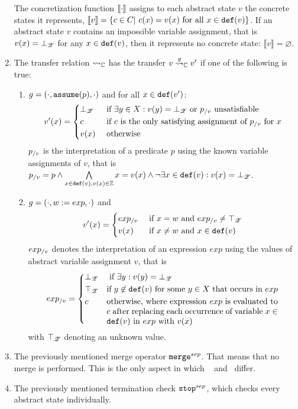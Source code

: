 \begin{enumerate}[leftmargin=*, label=\arabic*.]
	The concretization function $[\![ \cdot ]\!]$ assigns to each abstract state $v$ the concrete states it represents, $[\![ v ]\!] = \{ c \in C |\ c(x) = v(x) \text{ for all } x \in \texttt{def}(v)\}$.
	If an abstract state $v$ contains an impossible variable assignment, that is $v(x) = \bot_{\mathscr{Z}}$ for any $x \in \texttt{def}(v)$, then it represents no concrete state: $\llbracket v \rrbracket = \varnothing$.
\item The transfer relation $\rightsquigarrow_{\mathbb{C}}$ has the transfer $v \overset{g}{\rightsquigarrow}_{\mathbb{C}} v'$ if one of the following is true:
	\begin{enumerate}[label=\alph*)]
	\item $g = (\cdot, \texttt{assume}(p), \cdot)$ and for all $x \in \texttt{def}(v')$:
		\[ v'(x) = \begin{dcases}
			\bot_{\mathscr{Z}} & \text{ if } \exists y \in X : v(y) = \bot_{\mathscr{Z}} \text{ or } p_{/v} \text{ unsatisfiable}\\
			c & \text{ if $c$ is the only satisfying assignment of $p_{/v}$ for $x$}\\
			v(x) & \text{ otherwise }
		\end{dcases}\]
		$p_{/v}$ is the interpretation of a predicate $p$ using the known variable assignments of $v$, that is
		$p_{/v} = p \wedge \bigwedge\limits_{x \in \texttt{def}(v), v(x) \in \mathbb{Z}}  x = v(x) \wedge \neg \exists x \in \texttt{def}(v) : v(x) = \bot_{\mathscr{Z}}$.
	\item $g = (\cdot, w := exp, \cdot)$ and
		\[ v'(x) = \begin{dcases}
			exp_{/v} & \text{ if } x = w \text{ and } exp_{/v} \neq \top_{\mathscr{Z}}\\
			v(x) & \text{ if } x \neq w \text{ and } x \in \texttt{def}(v)\\
		\end{dcases}\]
		$exp_{/v}$ denotes the interpretation of an expression $exp$ using the values of abstract variable assignment $v$, that is
		\[exp_\using{v} = \begin{dcases}
			\bot_\valueset & \text{ if } \exists y : v(y) = \bot_\valueset\\
			\top_\valueset  & \parbox[t]{.6\textwidth}{if $y \not\in \defRange(v)$ for some $y \in X$ that occurs in $exp$}\\
			c & \parbox[t]{.6\textwidth}{ otherwise, where expression $exp$ is evaluated to $c$ after replacing each occurrence of variable $x \in \defRange(v)$ in $exp$ with $v(x)$}
		\end{dcases}\]
		with $\top_{\mathscr{Z}}$ denoting an unknown value.
	\end{enumerate}
\item The previously mentioned merge operator $\texttt{merge}^{sep}$. That means that no merge is performed. This is the only aspect in which \constantpropagationCPA\ \cite{BeyerBook} and \ differ.
\item The previously mentioned termination check $\texttt{stop}^{sep}$, which checks every abstract state individually.
\end{enumerate}

